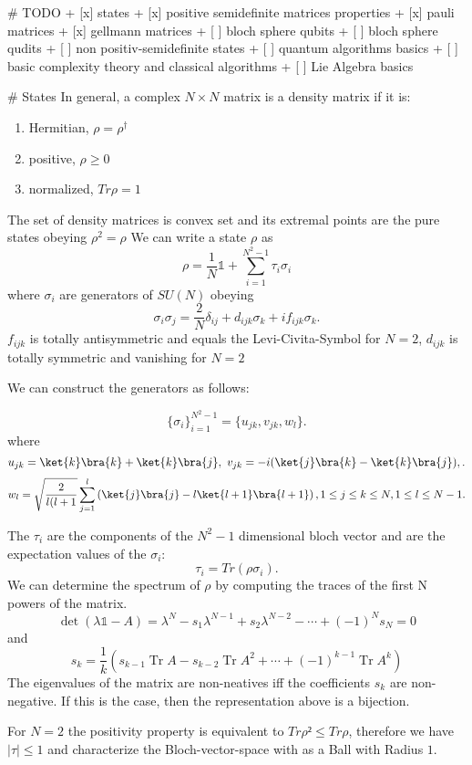 # TODO
+ [x] states
+ [x] positive semidefinite matrices properties
+ [x] pauli matrices
+ [x] gellmann matrices
+ [ ] bloch sphere qubits
+ [ ] bloch sphere qudits
+ [ ] non positiv-semidefinite states
+ [ ] quantum algorithms basics
+ [ ] basic complexity theory and classical algorithms
+ [ ] Lie Algebra basics


# States
In general, a complex $N \times N$ matrix is a density matrix if it is:
\begin{enumerate}[label=(\roman*)]
	\item Hermitian,	$\rho =\rho^{\dagger}$
	\item positive,		$\rho \ge 0$
	\item normalized,	$Tr\rho = 1$
\end{enumerate}
The set of density matrices is convex set and its extremal points are the pure states obeying $\rho^2 = \rho$
We can write a state $\rho$ as
$$\rho = \frac{1}{N} \mathbb{1} + \sum_{i=1}^{N^2-1} \tau_i \sigma_i$$
where $\sigma_i$ are generators of $SU(N)$ obeying
\[
	\sigma_i\sigma_j = \frac{2}{N}\delta_{ij} + d_{ijk}\sigma_k + if_{ijk}\sigma_k
.\]
$f_{ijk}$ is totally antisymmetric and equals the Levi-Civita-Symbol for $N=2$, $d_{ijk}$ is totally symmetric and vanishing for $N=2$

We can construct the generators as follows:

 \[
\{\sigma_i\}^{N^2-1}_{i=1} = \{u_{jk},v_{jk},w_l\}
.\]
where
\[
	u_{jk} = \ket{k}\bra{k}+\ket{k}\bra{j}, ~ v_{jk} = -i(\ket{j}\bra{k}-\ket{k}\bra{j}),
.\]
\[
	w_l = \sqrt{\frac{2}{l(l+1}} \sum_{j=1}^{l} \left( \ket{j}\bra{j}-l\ket{l+1}\bra{l+1} \right),
	1\le j\le k\le N, 1\le l\le N-1
.\]

The $\tau_i$ are the components of the $N^2-1$ dimensional bloch vector and are the expectation values of the $\sigma_i$:
 \[
	 \tau_i = Tr(\rho\sigma_i)
.\]
We can determine the spectrum of $\rho$ by computing the traces of the first N powers of the matrix.
$$\operatorname{det}(\lambda \mathbb{1}-A)=\lambda^{N}-s_{1} \lambda^{N-1}+s_{2} \lambda^{N-2}-\cdots+(-1)^{N} s_{N}=0$$
and
$$s_{k}=\frac{1}{k}\left(s_{k-1} \operatorname{Tr} A-s_{k-2} \operatorname{Tr} A^{2}+\cdots+(-1)^{k-1} \operatorname{Tr} A^{k}\right)$$
The eigenvalues of the matrix are non-neatives iff the coefficients $s_k$ are non-negative.
If this is the case, then the representation above is a bijection.

For $N=2$ the positivity property is equivalent to $Tr\rho²\le Tr\rho$, therefore we have $|\tau|\le 1$ and characterize the Bloch-vector-space with as a Ball with Radius $1$.

